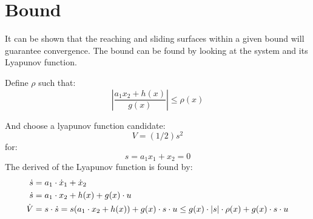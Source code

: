 \section{Bound} %
\label{sec:bound}
It can be shown that the reaching and sliding surfaces within a given bound will guarantee convergence. The bound can be found by looking at the system and its Lyapunov function.



Define $\rho$ such that:
\begin{equation}
        \left \vert \frac{a_1 x_2 + h(x)}{g(x)} \right \vert \leq \rho(x) 
\end{equation}

And choose a lyapunov function candidate:
\begin{equation}
        V=(1/2)s^2
\end{equation}
for:
\begin{equation}
        s=a_1 x_1+ x_2 = 0
\end{equation}
The derived of the Lyapunov function is found by:
\begin{equation}
        \begin{split}
                \dot{s} &= a_1 \cdot \dot{x}_1 + \dot{x}_2 \\
                \dot{s} &= a_1 \cdot x_2 + h(x) + g(x) \cdot u\\
                \dot{V} &= s \cdot \dot{s} = s(a_1 \cdot x_2+ h(x)) + g(x) \cdot s \cdot u \leq g(x) \cdot \vert s \vert \cdot \rho(x) + g(x) \cdot s\cdot u
        \end{split}
\end{equation}
        


